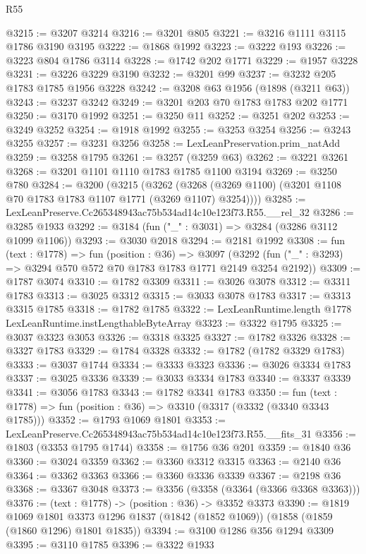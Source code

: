 \begin{lexlean}{R55}
\begin{coremodule}
@3215 := @3207 @3214
@3216 := @3201 @805
@3221 := @3216 @1111 @3115 @1786 @3190 @3195
@3222 := @1868 @1992
@3223 := @3222 @193
@3226 := @3223 @804 @1786 @3114
@3228 := @1742 @202 @1771
@3229 := @1957 @3228
@3231 := @3226 @3229 @3190
@3232 := @3201 @99
@3237 := @3232 @205 @1783 @1785 @1956 @3228
@3242 := @3208 @63 @1956 (@1898 (@3211 @63))
@3243 := @3237 @3242
@3249 := @3201 @203 @70 @1783 @1783 @202 @1771
@3250 := @3170 @1992
@3251 := @3250 @11
@3252 := @3251 @202
@3253 := @3249 @3252
@3254 := @1918 @1992
@3255 := @3253 @3254
@3256 := @3243 @3255
@3257 := @3231 @3256
@3258 := LexLeanPreservation.prim_natAdd
@3259 := @3258 @1795
@3261 := @3257 (@3259 @63)
@3262 := @3221 @3261
@3268 := @3201 @1101 @1110 @1783 @1785 @1100 @3194
@3269 := @3250 @780
@3284 := @3200
    (@3215
      (@3262 (@3268 (@3269 @1100) (@3201 @1108 @70 @1783 @1783 @1107 @1771 (@3269 @1107) @3254))))
@3285 := LexLeanPreserve.Cc265348943ac75b534ad14c10e123f73.R55.__rel_32
@3286 := @3285 @1933
@3292 := @3184 (fun ("_" : @3031) => @3284 (@3286 @3112 @1099 @1106))
@3293 := @3030 @2018
@3294 := @2181 @1992
@3308 := fun (text : @1778) =>
  fun (position : @36) =>
  @3097 (@3292 (fun ("_" : @3293) => @3294 @570 @572 @70 @1783 @1783 @1771 @2149 @3254 @2192))
@3309 := @1787 @3074
@3310 := @1782 @3309
@3311 := @3026 @3078
@3312 := @3311 @1783
@3313 := @3025 @3312
@3315 := @3033 @3078 @1783
@3317 := @3313 @3315 @1785
@3318 := @1782 @1785
@3322 := LexLeanRuntime.length @1778 LexLeanRuntime.instLengthableByteArray
@3323 := @3322 @1795
@3325 := @3037 @3323 @3053
@3326 := @3318 @3325
@3327 := @1782 @3326
@3328 := @3327 @1783
@3329 := @1784 @3328
@3332 := @1782 (@1782 @3329 @1783)
@3333 := @3037 @1744
@3334 := @3333 @3323
@3336 := @3026 @3334 @1783
@3337 := @3025 @3336
@3339 := @3033 @3334 @1783
@3340 := @3337 @3339
@3341 := @3056 @1783
@3343 := @1782 @3341 @1783
@3350 := fun (text : @1778) => fun (position : @36) => @3310 (@3317 (@3332 (@3340 @3343 @1785)))
@3352 := @1793 @1069 @1801
@3353 := LexLeanPreserve.Cc265348943ac75b534ad14c10e123f73.R55.__fits_31
@3356 := @1803 (@3353 @1795 @1744)
@3358 := @1756 @36 @201
@3359 := @1840 @36
@3360 := @3024 @3359
@3362 := @3360 @3312 @3315
@3363 := @2140 @36
@3364 := @3362 @3363
@3366 := @3360 @3336 @3339
@3367 := @2198 @36
@3368 := @3367 @3048
@3373 := @3356 (@3358 (@3364 (@3366 @3368 @3363)))
@3376 := (text : @1778) -> (position : @36) -> @3352 @3373
@3390 := @1819
    @1069
    @1801
    @3373
    @1296
    @1837
    (@1842 (@1852 @1069))
    (@1858 (@1859 (@1860 @1296) @1801 @1835))
@3394 := @3100 @1286 @356 @1294 @3309
@3395 := @3110 @1785
@3396 := @3322 @1933

\end{coremodule}
\end{lexlean}
